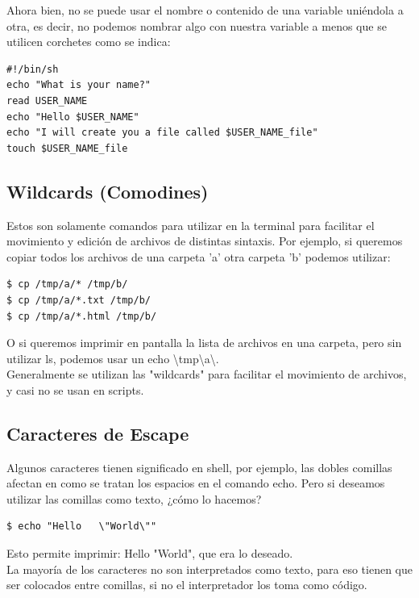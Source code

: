 \documentclass[12pt]{article}
\begin{document}
Ahora bien, no se puede usar el nombre o contenido de una variable uniéndola a otra, es decir, no podemos nombrar algo con nuestra variable a menos que se utilicen corchetes como se indica:

\begin{verbatim}
#!/bin/sh
echo "What is your name?"
read USER_NAME
echo "Hello $USER_NAME"
echo "I will create you a file called $USER_NAME_file"
touch $USER_NAME_file
\end{verbatim}

\subsection{Wildcards (Comodines)}
Estos son solamente comandos para utilizar en la terminal para facilitar el movimiento y edición de archivos de distintas sintaxis. Por ejemplo, si queremos copiar todos los archivos de una carpeta 'a'  otra carpeta 'b' podemos utilizar:

\begin{verbatim}
$ cp /tmp/a/* /tmp/b/
$ cp /tmp/a/*.txt /tmp/b/
$ cp /tmp/a/*.html /tmp/b/
\end{verbatim}

O si queremos imprimir en pantalla la lista de archivos en una carpeta, pero sin utilizar ls, podemos usar un echo \textbackslash tmp\textbackslash a\textbackslash *. \\

Generalmente se utilizan las "wildcards" para facilitar el movimiento de archivos, y casi no se usan en scripts.

\subsection{Caracteres de Escape}
Algunos caracteres tienen significado en shell, por ejemplo, las dobles comillas afectan en como se tratan los espacios en el comando echo. Pero si deseamos utilizar las comillas como texto, ¿cómo lo hacemos?

\begin{verbatim}
$ echo "Hello   \"World\""
\end{verbatim}

Esto permite imprimir: Hello    "World", que era lo deseado.  \\

La mayoría de los caracteres no son interpretados como texto, para eso tienen que ser colocados entre comillas, si no el interpretador los toma como código.
\end{document}
